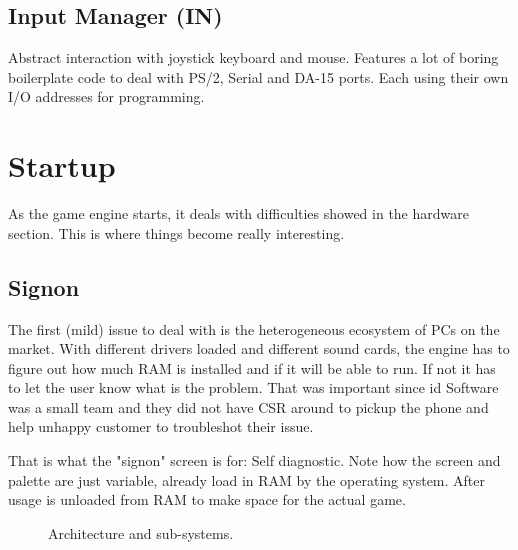 \documentclass[book.tex]{subfiles}
\begin{document}
\subsection{Input Manager (IN)}
Abstract interaction with joystick keyboard and mouse. Features a lot of boring boilerplate code to deal with PS/2, Serial and DA-15 ports. Each using their own I/O addresses for programming.
















\section{Startup}
As the game engine starts, it deals with difficulties showed in the hardware section. This is where things become really interesting.

\subsection{Signon}
The first (mild) issue to deal with is the heterogeneous ecosystem of PCs on the market. With different drivers loaded and different sound cards, the engine has to figure out how much RAM is installed and if it will be able to run. If not it has to let the user know what is the problem. That was important since id Software was a small team and they did not have CSR around to pickup the phone and help unhappy customer to troubleshot their issue.\\
\par
That is what the "signon" screen is for: Self diagnostic. Note how the screen and palette are just variable, already load in RAM by the operating system. After usage  is unloaded from RAM to make space for the actual game.\\
\par
\begin{figure}[H]
\centering
{}
\caption{Architecture and sub-systems.}
\end{figure}
\par
\end{document}
